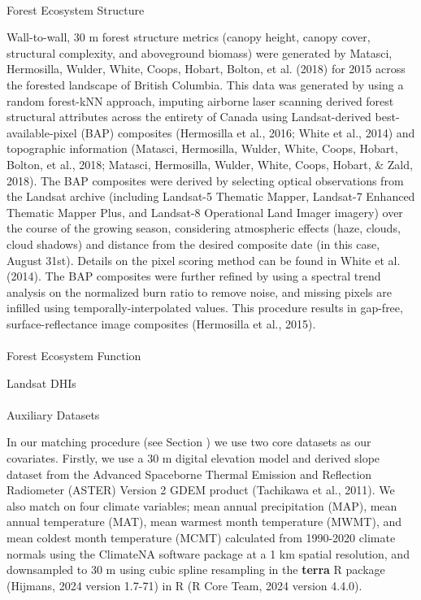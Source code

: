 \documentclass[
]{agujournal2019}
\makeatletter
\let\oldparagraph\paragraph
\renewcommand{\paragraph}{
    \@ifstar
      \xxxParagraphStar
      \xxxParagraphNoStar
  }
\newcommand{\xxxParagraphStar}[1]{\oldparagraph*{#1}\mbox{}}
\newcommand{\xxxParagraphNoStar}[1]{\oldparagraph{#1}\mbox{}}
\makeatother
\begin{document}
\paragraph{Forest Ecosystem Structure}\label{forest-ecosystem-structure}

Wall-to-wall, 30 m forest structure metrics (canopy height, canopy
cover, structural complexity, and aboveground biomass) were generated by
Matasci, Hermosilla, Wulder, White, Coops, Hobart, Bolton, et al. (2018)
for 2015 across the forested landscape of British Columbia. This data
was generated by using a random forest-kNN approach, imputing airborne
laser scanning derived forest structural attributes across the entirety
of Canada using Landsat-derived best-available-pixel (BAP) composites
(Hermosilla et al., 2016; White et al., 2014) and topographic
information (Matasci, Hermosilla, Wulder, White, Coops, Hobart, Bolton,
et al., 2018; Matasci, Hermosilla, Wulder, White, Coops, Hobart, \&
Zald, 2018). The BAP composites were derived by selecting optical
observations from the Landsat archive (including Landsat-5 Thematic
Mapper, Landsat-7 Enhanced Thematic Mapper Plus, and Landsat-8
Operational Land Imager imagery) over the course of the growing season,
considering atmospheric effects (haze, clouds, cloud shadows) and
distance from the desired composite date (in this case, August 31st).
Details on the pixel scoring method can be found in White et al. (2014).
The BAP composites were further refined by using a spectral trend
analysis on the normalized burn ratio to remove noise, and missing
pixels are infilled using temporally-interpolated values. This procedure
results in gap-free, surface-reflectance image composites (Hermosilla et
al., 2015).

\paragraph{Forest Ecosystem Function}\label{forest-ecosystem-function}

Landsat DHIs

\paragraph{Auxiliary Datasets}\label{auxiliary-datasets}

In our matching procedure (see Section ) we use two core datasets as our
covariates. Firstly, we use a 30 m digital elevation model and derived
slope dataset from the Advanced Spaceborne Thermal Emission and
Reflection Radiometer (ASTER) Version 2 GDEM product (Tachikawa et al.,
2011). We also match on four climate variables; mean annual
precipitation (MAP), mean annual temperature (MAT), mean warmest month
temperature (MWMT), and mean coldest month temperature (MCMT) calculated
from 1990-2020 climate normals using the ClimateNA software package at a
1 km spatial resolution, and downsampled to 30 m using cubic spline
resampling in the \textbf{terra} R package (Hijmans, 2024 version
1.7-71) in R (R Core Team, 2024 version 4.4.0).
\end{document}
